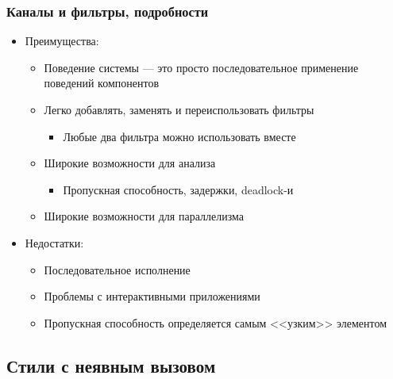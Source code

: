 \documentclass{../../slides-style}
\begin{document}
    \begin{frame}
        \frametitle{Каналы и фильтры, подробности}
        \begin{itemize}
            \item Преимущества:
            \begin{itemize}
                \item Поведение системы --- это просто последовательное применение поведений компонентов
                \item Легко добавлять, заменять и переиспользовать фильтры
                \begin{itemize}
                    \item Любые два фильтра можно использовать вместе
                \end{itemize}
                \item Широкие возможности для анализа
                \begin{itemize}
                    \item Пропускная способность, задержки, deadlock-и
                \end{itemize}
                \item Широкие возможности для параллелизма
            \end{itemize}
            \item Недостатки:
            \begin{itemize}
                \item Последовательное исполнение
                \item Проблемы с интерактивными приложениями
                \item Пропускная способность определяется самым <<узким>> элементом
            \end{itemize}
        \end{itemize}
    \end{frame}

    \subsection{Стили с неявным вызовом}
\end{document}
